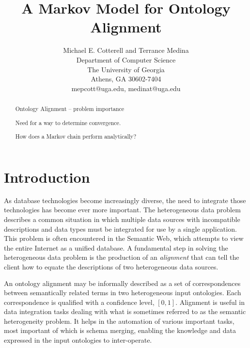 \documentclass[letterpaper,twocolumn,12pt]{article}
\begin{document}
\newtheorem{defn}{Definition}

\title{A Markov Model for Ontology Alignment}

\author{Michael E. Cotterell and Terrance Medina \\
Department of Computer Science \\
The University of Georgia \\
Athens, GA 30602-7404 \\
mepcott@uga.edu, medinat@uga.edu
}

\maketitle

\begin{abstract}
Ontology Alignment -- problem importance

Need for a way to determine convergence.

How does a Markov chain perform analytically?

\end{abstract}


\section{Introduction}


As database technologies become increasingly diverse, the need to integrate those technologies has become ever more important. 
The heterogeneous data problem describes a common situation in which multiple data sources with incompatible descriptions and data types must be integrated for use by a single application. 
This problem is often encountered in the Semantic Web, which attempts to view the entire Internet as a unified database. 
A fundamental step in solving the heterogeneous data problem is the production of an \textit{alignment} that can tell the client how to equate the descriptions of two heterogeneous data sources.

An ontology alignment may be informally described as a set of correspondences between semantically related terms in two heterogeneous input ontologies. 
Each correspondence is qualified with a confidence level, $[0,1]$.
Alignment is useful in data integration tasks dealing with what is sometimes referred to as the semantic heterogeneity problem. 
It helps in the automation of various important tasks, most important of which is schema merging, enabling the knowledge and data expressed in the input ontologies to inter-operate.
\end{document}
